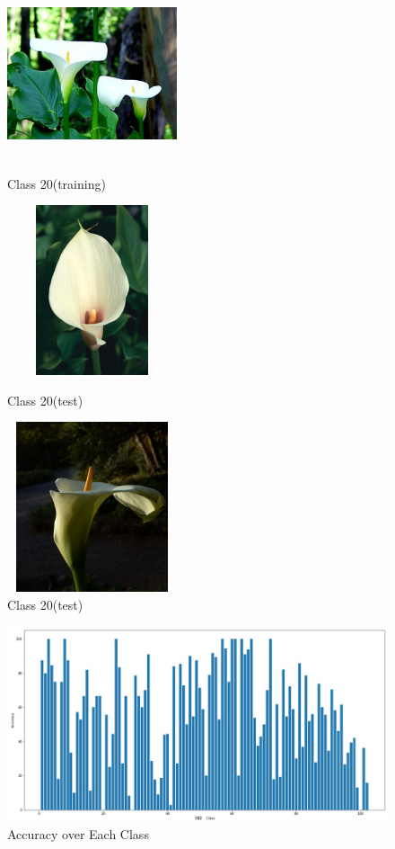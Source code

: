 \documentclass[a4paper,19pt]{article}
\begin{document}
\begin{figure}[!htb]
  \includegraphics[width=5cm, height=5cm]{images/image_04923.jpg}
  \caption{Class 20(training)}\label{fig:awesome_image1}
\endminipage\hfill
{}
  \includegraphics[width=5cm, height=5cm]{images/Class20_2.jpg}
  \caption{Class 20(test)}\label{fig:awesome_image2}
\endminipage\hfill
{}%
  \includegraphics[width=5cm, height=5cm]{images/Class20_3.jpg}
  \caption{Class 20(test)}\label{fig:awesome_image3}
\endminipage
\end{figure}





\begin{figure}[h!]
\centering
\includegraphics[scale=0.4]{images/Acc_Each_Class.png}
\caption{Accuracy over Each Class}
\label{fig:Results}
\end{figure}
\end{document}
